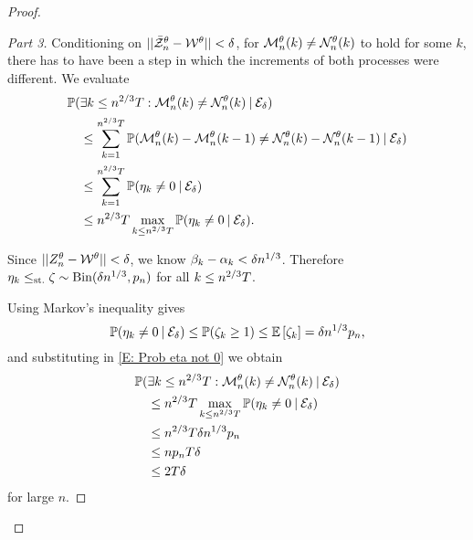 \begin{proof}
\begin{proof}[Part 3]
Conditioning on $||\bar{\mathcal{Z}}^{\theta}_n - \mathcal{W}^{\theta}|| < \delta$, for $\mathcal{M}_n^{\theta}(k) \neq \mathcal{N}_n^{\theta}(k)$ to hold for some $k$,
there has to have been a step in which the increments of both processes were different.
We evaluate
\begin{equation} \label{E: Prob eta not 0}
\begin{aligned}
&\mathbb{P}(\exists k\leq n^{2 / 3}T: \mathcal{M}_n^{\theta}(k) \neq \mathcal{N}_n^{\theta}(k) \: | \: \mathcal{E}_{\delta}) \\
&\quad \leq \sum_{k=1}^{n^{2 / 3}T} \mathbb{P}( \mathcal{M}_n^{\theta}(k) - \mathcal{M}_n^{\theta}(k-1) \neq \mathcal{N}_n^{\theta}(k) - \mathcal{N}_n^{\theta}(k-1) \: | \: \mathcal{E}_{\delta}) \\
&\quad \leq \sum_{k=1}^{n^{2 / 3}T} \mathbb{P}( \eta_k \neq 0 \: | \: \mathcal{E}_{\delta}) \\
&\quad \leq n^{2 / 3}T \max_{k \leq n^{2 / 3}T} \mathbb{P}(\eta_k \neq 0 \: | \: \mathcal{E}_{\delta}).
\end{aligned}
\end{equation}

Since $||Z_n^{\theta} - \mathcal{W}^{\theta}|| < \delta$, we know $\beta_k - \alpha_k < \delta n^{1 / 3}$. Therefore
$\eta_k \leq_{\text{st.}} \zeta \sim \operatorname*{Bin}(\delta n^{1 / 3}, p_n)$ for all $k \leq n^{2 / 3}T$.

Using Markov's inequality gives
\begin{equation}
\mathbb{P}( \eta_k \neq 0 \: | \: \mathcal{E}_{\delta} ) \leq \mathbb{P}( \zeta_k \geq 1 ) \leq \mathbb{E} \left[ \zeta_k \right] = \delta n^{1 / 3}p_n,
\end{equation}
and substituting in \eqref{E: Prob eta not 0} we obtain
\begin{equation}
\begin{aligned}
&\mathbb{P}(\exists k\leq n^{2 / 3}T: \mathcal{M}_n^{\theta}(k) \neq \mathcal{N}_n^{\theta}(k) \: | \: \mathcal{E}_{\delta}) \\
&\quad \leq n^{2 / 3}T \max_{k \leq n^{2 / 3}T} \mathbb{P}( \eta_k \neq 0 \: | \: \mathcal{E}_{\delta} ) \\
&\quad \leq n^{2 / 3}T\delta n^{1 / 3}p_n \\
&\quad \leq n p_n T \delta \\
&\quad \leq 2T\delta 
\end{aligned}
\end{equation}
for large $n$.


\end{proof}
\end{proof}
